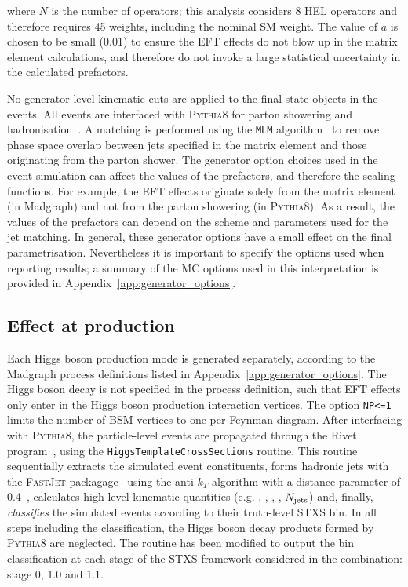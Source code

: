 \noindent
where $N$ is the number of operators; this analysis considers 8 HEL operators and therefore requires 45 weights, including the nominal SM weight. The value of $a$ is chosen to be small (0.01) to ensure the EFT effects do not blow up in the matrix element calculations, and therefore do not invoke a large statistical uncertainty in the calculated prefactors.

No generator-level kinematic cuts are applied to the final-state objects in the events. All events are interfaced with \textsc{Pythia8} for parton showering and hadronisation~\cite{Sjostrand:2014zea}. A matching is performed using the \texttt{MLM} algorithm~\cite{Alwall:2007fs} to remove phase space overlap between jets specified in the matrix element and those originating from the parton shower. The generator option choices used in the event simulation can affect the values of the prefactors, and therefore the scaling functions. For example, the EFT effects originate solely from the matrix element (in Madgraph) and not from the parton showering (in \textsc{Pythia8}). As a result, the values of the prefactors can depend on the scheme and parameters used for the jet matching. In general, these generator options have a small effect on the final parametrisation. Nevertheless it is important to specify the options used when reporting results; a summary of the MC options used in this interpretation is provided in Appendix~\ref{app:generator_options}.

\subsection{Effect at production}
Each Higgs boson production mode is generated separately, according to the Madgraph process definitions listed in Appendix~\ref{app:generator_options}. The Higgs boson decay is not specified in the process definition, such that EFT effects only enter in the Higgs boson production interaction vertices. The option \texttt{NP<=1} limits the number of BSM vertices to one per Feynman diagram. After interfacing with \textsc{Pythia8}, the particle-level events are propagated through the Rivet program~\cite{Buckley:2010ar}, using the \texttt{HiggsTemplateCrossSections} routine. This routine sequentially extracts the simulated event constituents, forms hadronic jets with the \textsc{FastJet} packagage~\cite{Cacciari:2011ma} using the anti-$k_T$ algorithm with a distance parameter of 0.4~\cite{Cacciari:2008gp}, calculates high-level kinematic quantities (e.g. \ptH, \ptV, \ptHjj, \mjj, $N_{\rm{jets}}$) and, finally, \textit{classifies} the simulated events according to their truth-level STXS bin. In all steps including the classification, the Higgs boson decay products formed by \textsc{Pythia8} are neglected. The routine has been modified to output the bin classification at each stage of the STXS framework considered in the combination: stage 0, 1.0 and 1.1.


